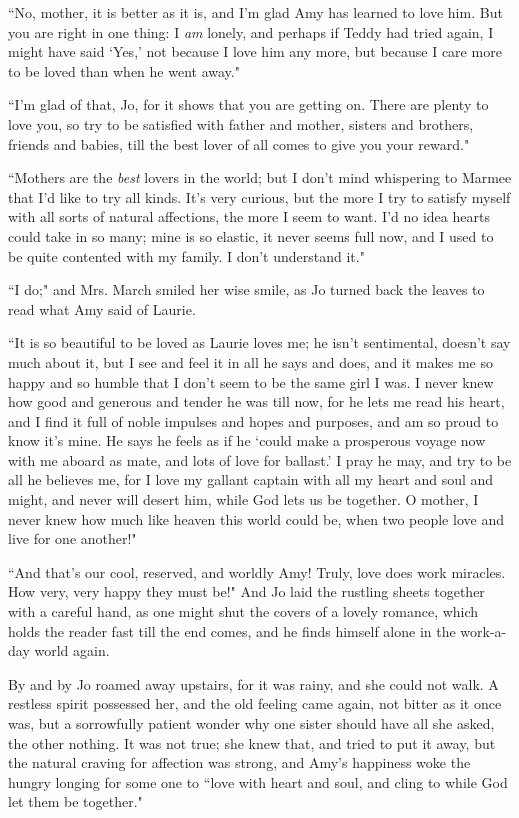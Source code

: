 ``No, mother, it is better as it is, and I'm glad Amy has
learned to love him. But you are right in one thing: I \emph{am} lonely,
and perhaps if Teddy had tried again, I might have said
`Yes,' not because I love him any more,
but because I care more to be loved than when he went away."

``I'm glad of that, Jo, for it shows that you are getting
on. There are plenty to love you, so try to be satisfied with father and
mother, sisters and brothers, friends and babies, till the best lover of
all comes to give you your reward."

``Mothers are the \emph{best} lovers in the world; but I
don't mind whispering to Marmee that I'd
like to try all kinds. It's very curious, but the more I
try to satisfy myself with all sorts of natural affections, the more I
seem to want. I'd no idea hearts could take in so many;
mine is so elastic, it never seems full now, and I used to be quite
contented with my family. I don't understand it."

``I do;" and Mrs. March smiled her wise smile, as Jo turned back the
leaves to read what Amy said of Laurie.

``It is so beautiful to be loved as Laurie loves me; he
isn't sentimental, doesn't say much
about it, but I see and feel it in all he says and does, and it makes me
so happy and so humble that I don't seem to be the same
girl I was. I never knew how good and generous and tender he was till
now, for he lets me read his heart, and I find it full of noble impulses
and hopes and purposes, and am so proud to know it's
mine. He says he feels as if he `could make a prosperous
voyage now with me aboard as mate, and lots of love for
ballast.' I pray he may, and try to be all he believes
me, for I love my gallant captain with all my heart and soul and might,
and never will desert him, while God lets us be together. O mother, I
never knew how much like heaven this world could be, when two people
love and live for one another!"

``And that's our cool, reserved, and worldly Amy! Truly,
love does work miracles. How very, very happy they must be!" And Jo laid
the rustling sheets together with a careful hand, as one might shut the
covers of a lovely romance, which holds the reader fast till the end
comes, and he finds himself alone in the work-a-day world again.

By and by Jo roamed away upstairs, for it was rainy, and she could not
walk. A restless spirit possessed her, and the old feeling came again,
not bitter as it once was, but a sorrowfully patient wonder why one
sister should have all she asked, the other nothing. It was not true;
she knew that, and tried to put it away, but the natural craving for
affection was strong, and Amy's happiness woke the
hungry longing for some one to ``love with heart and soul, and cling to
while God let them be together."

